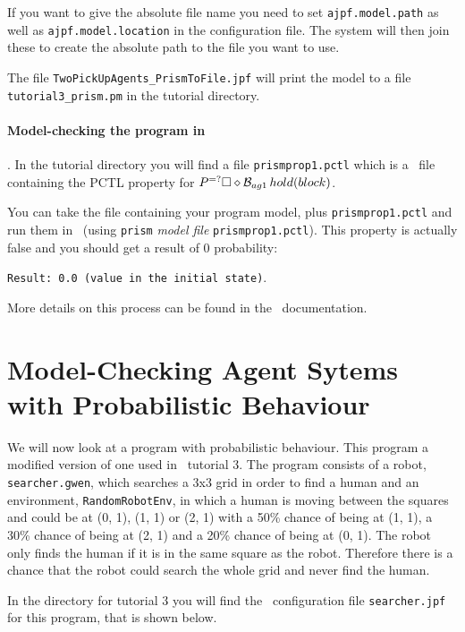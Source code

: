 \documentclass[a4]{article}
\begin{document}
If you want to give the absolute file name you need to set \texttt{ajpf.model.path} as well as \texttt{ajpf.model.location} in the configuration file.  The system will then join these to create the absolute path to the file you want to use.

The file \texttt{TwoPickUpAgents\_PrismToFile.jpf} will print the model to a file \texttt{tutorial3\_prism.pm} in the tutorial directory.

\paragraph{Model-checking the program in \prism}.  In the tutorial directory you will find a file \texttt{prismprop1.pctl} which is a \prism\ file containing the PCTL property for $P^{=?}\Box \diamond \mathrm{{\cal B}}_{ag1} \, hold(block)$.  

You can take the file containing  your program model, plus \texttt{prismprop1.pctl} and run them in \prism\ (using \texttt{prism} \emph{model file} \texttt{prismprop1.pctl}).  This property is actually false and you should get a result of 0 probability:

\texttt{Result: 0.0 (value in the initial state)}.

More details on this process can be found in the \spin\ documentation.

\section{Model-Checking Agent Sytems with Probabilistic Behaviour}

We will now look at a program with probabilistic behaviour.  This program a modified version of one used in \ail\ tutorial 3. The program consists of a robot, \texttt{searcher.gwen}, which searches a 3x3 grid in order to find a human and an environment, \texttt{RandomRobotEnv}, in which a human is moving between the squares and could be at (0, 1), (1, 1) or (2, 1) with a 50\% chance of being at (1, 1), a 30\% chance of being at (2, 1) and a 20\% chance of being at (0, 1).  The robot only finds the human if it is in the same square as the robot.  Therefore there is a chance that the robot could search the whole grid and never find the human.


In the directory for tutorial 3 you will find the \ajpf\ configuration file \texttt{searcher.jpf} for this program, that is shown below.
\end{document}
